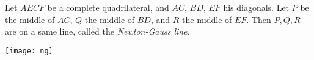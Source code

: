 \documentclass[12pt]{article}
\begin{document}
Let $AECF$ be a complete quadrilateral, and $AC$, $BD$, $EF$ his
diagonals. Let $P$ be the middle of $AC$, $Q$ the middle of $BD$,
and $R$ the middle of $EF$. Then $P, Q, R$ are on a same line,
called the \emph{Newton-Gauss line.}

\begin{center}
\texttt{[image: ng]}
\end{center}
\end{document}
